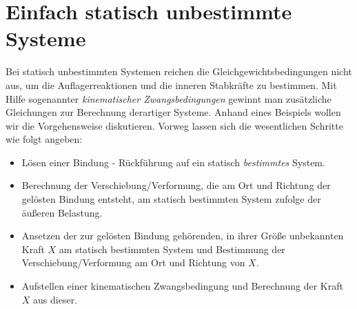 \section{Einfach statisch unbestimmte Systeme}

Bei statisch unbestimmten Systemen reichen die Gleichgewichtsbedingungen nicht aus, um die Auflagerreaktionen und die inneren Stabkräfte zu bestimmen.
Mit Hilfe sogenannter \emph{kinematischer Zwangsbedingungen} gewinnt man zusätzliche Gleichungen zur Berechnung derartiger Systeme.
Anhand eines Beispiels wollen wir die Vorgehensweise diskutieren.
Vorweg lassen sich die wesentlichen Schritte wie folgt angeben:
%
\begin{itemize}
	\item Lösen einer Bindung - Rückführung auf ein statisch \emph{bestimmtes} System.
	\item Berechnung der Verschiebung/Verformung, die am Ort und Richtung der gelösten Bindung entsteht, am statisch bestimmten System zufolge der äußeren Belastung.
	\item Ansetzen der zur gelösten Bindung gehörenden, in ihrer Größe unbekannten Kraft $X$ am statisch bestimmten System und Bestimmung der Verschiebung/Verformung am Ort und Richtung von $X$. 
	\item Aufstellen einer kinematischen Zwangsbedingung und Berechnung der Kraft $X$ aus dieser.
\end{itemize}

